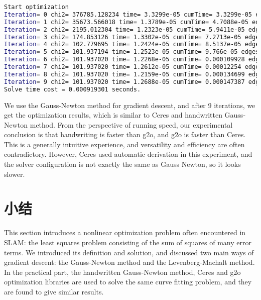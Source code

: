 \clearpage
\begin{lstlisting}[language=sh,caption=Terminal output:]
Start optimization
Iteration= 0 chi2= 376785.128234 time= 3.3299e-05 cumTime= 3.3299e-05 edges= 100 schur= 0
Iteration= 1 chi2= 35673.566018 time= 1.3789e-05 cumTime= 4.7088e-05 edges= 100 schur= 0
Iteration= 2 chi2= 2195.012304 time= 1.2323e-05 cumTime= 5.9411e-05 edges= 100 schur= 0
Iteration= 3 chi2= 174.853126 time= 1.3302e-05 cumTime= 7.2713e-05 edges= 100 schur= 0
Iteration= 4 chi2= 102.779695 time= 1.2424e-05 cumTime= 8.5137e-05 edges= 100 schur= 0
Iteration= 5 chi2= 101.937194 time= 1.2523e-05 cumTime= 9.766e-05 edges= 100 schur= 0
Iteration= 6 chi2= 101.937020 time= 1.2268e-05 cumTime= 0.000109928 edges= 100 schur= 0
Iteration= 7 chi2= 101.937020 time= 1.2612e-05 cumTime= 0.00012254 edges= 100 schur= 0
Iteration= 8 chi2= 101.937020 time= 1.2159e-05 cumTime= 0.000134699 edges= 100 schur= 0
Iteration= 9 chi2= 101.937020 time= 1.2688e-05 cumTime= 0.000147387 edges= 100 schur= 0
Solve time cost = 0.000919301 seconds.
\end{lstlisting}

We use the Gauss-Newton method for gradient descent, and after 9 iterations, we get the optimization results, which is similar to Ceres and handwritten Gauss-Newton method. From the perspective of running speed, our experimental conclusion is that handwriting is faster than g2o, and g2o is faster than Ceres. This is a generally intuitive experience, and versatility and efficiency are often contradictory. However, Ceres used automatic derivation in this experiment, and the solver configuration is not exactly the same as Gauss Newton, so it looks slower.

\section{小结}
This section introduces a nonlinear optimization problem often encountered in SLAM: the least squares problem consisting of the sum of squares of many error terms. We introduced its definition and solution, and discussed two main ways of gradient descent: the Gauss-Newton method and the Levenberg-Machalt method. In the practical part, the handwritten Gauss-Newton method, Ceres and g2o optimization libraries are used to solve the same curve fitting problem, and they are found to give similar results.

